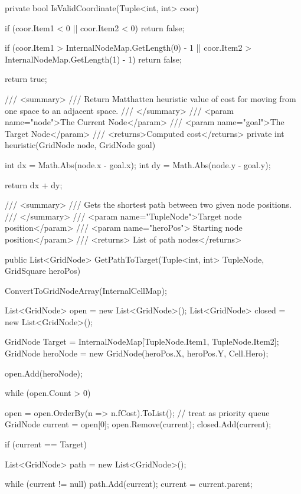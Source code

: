 \documentclass[11pt]{article}
\begin{document}
\begin{code}
{{        private bool IsValidCoordinate(Tuple<int, int> coor)
        {
            if (coor.Item1 < 0 || coor.Item2 < 0)
            {
                return false;
            }

            if (coor.Item1 > InternalNodeMap.GetLength(0) - 1
              || coor.Item2 > InternalNodeMap.GetLength(1) - 1)
            {
                return false;
            }

            return true;
        }

        /// <summary>
        /// Return Matthatten heuristic value of cost for moving from one space to an adjacent space.
        /// </summary>
        /// <param name="node">The Current Node</param>
        /// <param name="goal">The Target Node</param>
        /// <returns>Computed cost</returns>
        private int heuristic(GridNode node, GridNode goal)
        {
            int dx = Math.Abs(node.x - goal.x);
            int dy = Math.Abs(node.y - goal.y);

            return dx + dy;
        }
        /// <summary>
        /// Gets the shortest path between two given node positions. 
        /// </summary>
        /// <param name="TupleNode">Target node position</param>
        /// <param name="heroPos"> Starting node position</param>
        /// <returns> List of path nodes</returns>

        public List<GridNode> GetPathToTarget(Tuple<int, int> TupleNode, GridSquare heroPos){

            ConvertToGridNodeArray(InternalCellMap);

            List<GridNode> open = new List<GridNode>();
            List<GridNode> closed = new List<GridNode>();

            GridNode Target = InternalNodeMap[TupleNode.Item1, TupleNode.Item2];
            GridNode heroNode = new GridNode(heroPos.X, heroPos.Y, Cell.Hero);

            open.Add(heroNode);

            while (open.Count > 0)
            {

                open = open.OrderBy(n => n.fCost).ToList(); // treat as priority queue
                GridNode current = open[0];
                open.Remove(current);
                closed.Add(current);

                if (current == Target)
                {
                    List<GridNode> path = new List<GridNode>();

                    while (current != null)
                    {
                        path.Add(current);
                        current = current.parent;
                    }

}}}}}
\end{code}
\end{document}
